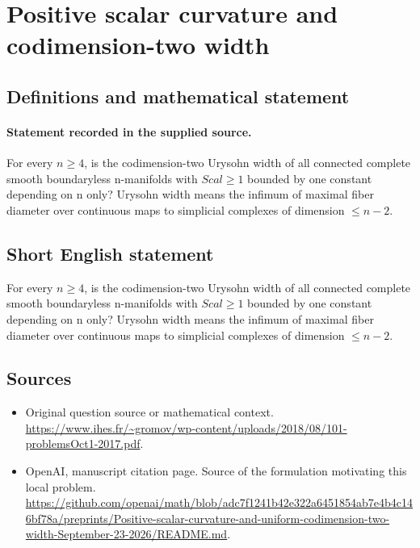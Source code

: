 \documentclass[11pt]{article}
\begin{document}
\section*{Positive scalar curvature and codimension-two width}\label{30007162}
\subsection{Definitions and mathematical statement}
\paragraph{Statement recorded in the supplied source.}
For every $n\geq 4$, is the codimension-two Urysohn width of all connected complete smooth boundaryless n-manifolds with $Scal\geq 1$ bounded by one constant depending on n only? Urysohn width means the infimum of maximal fiber diameter over continuous maps to simplicial complexes of dimension $\leq n-2$.
\subsection{Short English statement}
For every $n\geq 4$, is the codimension-two Urysohn width of all connected complete smooth boundaryless n-manifolds with $Scal\geq 1$ bounded by one constant depending on n only? Urysohn width means the infimum of maximal fiber diameter over continuous maps to simplicial complexes of dimension $\leq n-2$.
\subsection{Sources}
\begin{itemize}
\item[S1] Original question source or mathematical context.
\url{https://www.ihes.fr/~gromov/wp-content/uploads/2018/08/101-problemsOct1-2017.pdf}.
\item[S2] OpenAI, manuscript citation page. Source of the formulation motivating this local problem.
\url{https://github.com/openai/math/blob/adc7f1241b42e322a6451854ab7e4b4c146bf78a/preprints/Positive-scalar-curvature-and-uniform-codimension-two-width-September-23-2026/README.md}.
\end{itemize}
\end{document}
